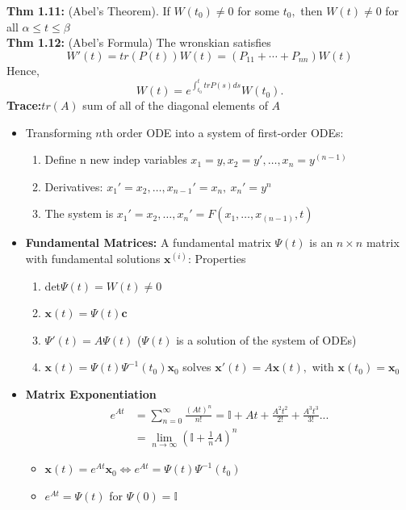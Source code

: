 \documentclass[10pt,landscape]{article}
\newcommand{\mbf}{\mathbf}
\begin{document}
\begin{multicols}{2}
\textbf{Thm 1.11:} (Abel's Theorem). If $W(t_0)\neq 0$ for some $t_0,$ then $W(t)\neq 0$ for all $\alpha\le t\le \beta$ \\
\textbf{Thm 1.12:} (Abel's Formula) The wronskian satisfies \\$$W'(t)=tr(P(t))W(t)=(P_{11}+\cdots +P_{nn})W(t)$$ Hence, $$W(t)=e^{\int_{t_0}^t trP(s)ds} W(t_0).$$
\textbf{Trace:}$tr(A)$ sum of all of the diagonal elements of $A$
\begin{itemize}
    \item Transforming $n$th order ODE into a system of first-order ODEs: \begin{enumerate}
        \item Define n new indep variables $x_1=y, x_2=y', \dots, x_n = y^{(n-1)} $

        \item Derivatives: $x_1'=x_2, \dots, x_{n-1}' = x_n, \ x_n' = y^n$
        \item The system is $x_1'=x_2,\dots, x_n'=F(x_1,\dots,x_{(n-1)},t)$
    \end{enumerate}
    
    \item \textbf{Fundamental Matrices:} A fundamental matrix $\Psi(t)$ is an $n\times n$ matrix with fundamental solutions $\mbf{x}^{(i)}$: Properties 

    \begin{enumerate}
        \item det$\Psi(t)=W(t)\neq 0$
        \item $\mbf{x}(t) = \Psi(t)\mbf{c}$
        \item $\Psi'(t)=A\Psi(t)$ ($\Psi(t)$ is a solution of the system of ODEs)
        \item $\mbf{x}(t) = \Psi(t)\Psi^{-1}(t_0)\mbf{x}_0$ solves $\mbf{x}'(t)= A\mbf{x}(t),$ with $\mbf{x}(t_0)=\mbf{x}_0$
     \end{enumerate}
     \item \textbf{Matrix Exponentiation}\\
       \begin{align*}
 	 e^{At} &= \sum_{n=0}^\infty \frac{(At)^n}{n!} = \mathbb{I}+At+\frac{A^2t^2}{2!}+\frac{A^3t^3}{3!}... \\
  	 &= \lim_{n \rightarrow \infty} \left(\mathbb{I}+\frac{1}{n}A\right)^n
  \end{align*}
  \begin{itemize}
  	\item $\mathbf{x}(t) = e^{At}\mathbf{x}_0 \iff e^{At} = \Psi(t)\Psi^{-1}(t_0)$
	\item$e^{At} = \Psi(t)$ for $\Psi(0) = \mathbb{I}$
  \end{itemize}


\end{itemize}
\end{multicols}
\end{document}
